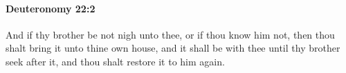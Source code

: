 
		\paragraph{Deuteronomy 22:2} %
			\label{DEUTERONOMY-22-2}

			And if thy brother be not nigh unto thee, or if thou know him not, then thou shalt bring it unto thine own house, and it shall be with thee until thy brother seek after it, and thou shalt restore it to him again.


